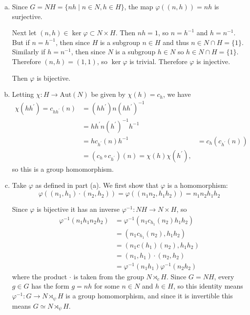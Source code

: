\documentclass{article}
\begin{document}
\begin{Answer}
\begin{enumerate}[(a)]
  \item{Since $G = NH = \{ nh \mid n \in N, h \in H \}$,
        the map $\varphi((n, h)) = nh$ is surjective.

        Next let $(n, h) \in \ker \varphi \subset N \times H$. Then
        $nh = 1$, so $n = h^{-1}$ and $h = n^{-1}$. But if
        $n = h^{-1}$, then since $H$ is a subgroup $n \in H$
        and thus $n \in N \cap H = \{1\}$.
        Similarly if $h = n^{-1}$, then
        since $N$ is a subgroup $h \in N$ so $h \in N \cap H = \{1\}$.
        Therefore $(n, h) = (1, 1)$, so $\ker \varphi$ is trivial.
        Therefore $\varphi$ is injective.

        Then $\varphi$ is bijective.
       }
  \item{
    Letting $\chi : H \to \mathrm{Aut}(N)$ be given by
    $\chi(h) = c_h$, we have
    \begin{align*}
     \chi(h h^\prime) =  c_{h h^\prime}(n)
  &= (h h^\prime) n (h h^\prime)^{-1} \\
  &= h h^\prime n (h^\prime)^{-1} h^{-1} \\
  &= h c_{h^\prime}(n) h^{-1}
  &= c_h (c_{h^\prime} (n)) \\
  &= (c_h \circ c_{h^\prime})(n) = \chi(h) \chi(h^\prime),
    \end{align*}
    so this is a group homomorphism.
  }
  \item{
    Take $\varphi$ as defined in part (a). We first show that
    $\varphi$ is a homomorphism:
    $$
    \varphi((n_1, h_1) \cdot (n_2, h_2))
  = \varphi((n_1 n_2, h_1 h_2))
  = n_1 n_2 h_1 h_2
    $$

    Since $\varphi$ is
    bijective it has an inverse $\varphi^{-1} : NH \to N \times H$, so
    \begin{align*}
    \varphi^{-1}(n_1 h_1 n_2 h_2)
 &= \varphi^{-1}(n_1 c_{h_1}(n_2) h_1 h_2) \\
 &= (n_1 c_{h_1}(n_2), h_1 h_2) \\
 &= (n_1 c(h_1)(n_2), h_1 h_2) \\
 &= (n_1, h_1) \cdot (n_2, h_2) \\
 &= \varphi^{-1}(n_1 h_1) \varphi^{-1}(n_2 h_2)
    \end{align*}
    where the product
    $\cdot$ is taken from the group $N \rtimes_c H$. Since $G = NH$,
    every $g \in G$ has the form $g = nh$ for some $n \in N$ and $h
    \in H$, so this identity means
    $\varphi^{-1} : G \to N \rtimes_{\psi} H$ is a group
    homomorphism, and since it is invertible this means
    $G \simeq N \rtimes_{\psi} H$.
  }
\end{enumerate}
\end{Answer}
\end{document}
